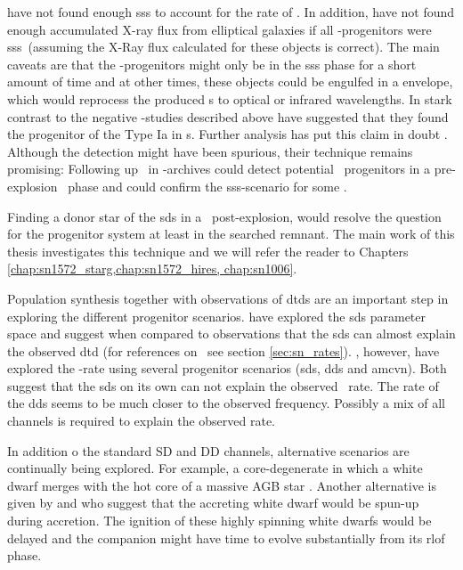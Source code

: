 \cite{2010ApJ...719..474D} have not found enough \gls{sss} to account for the rate of \sneia. In addition, \cite{2010Natur.463..924G} have not found enough accumulated X-ray flux from elliptical galaxies if all \snia-progenitors were \gls{sss}\ (assuming the X-Ray flux calculated for these objects is correct). The main caveats are that the \snia-progenitors might only be in the \gls{sss} phase for a short amount of time and at other times, these objects could be engulfed in a envelope, which would reprocess the produced \xray s to optical or infrared wavelengths. In stark contrast to the negative \xray-studies described above \citet{2008Natur.451..802V} have suggested that they found the progenitor of the Type Ia  in \xray s. Further analysis has put this claim in doubt \citep{2008MNRAS.391..290R}. Although the detection might have been spurious, their technique remains promising: Following up \sneia\ in \xray-archives could detect potential \sneia\ progenitors in a pre-explosion \xray\ phase and could confirm the \gls{sss}-scenario for some \sneia.

Finding a donor star of the \gls{sds} in a \snr\ post-explosion, would resolve the question for the progenitor system at least in the searched remnant. The main work of this thesis investigates this technique and we will refer the reader to Chapters \ref{chap:sn1572_starg,chap:sn1572_hires, chap:sn1006}. 

Population synthesis together with observations of \glspl{dtd} are an important step in exploring the different progenitor scenarios. \citet{2008ApJ...683L.127H, Han:2004p444}  have explored the \gls{sds} parameter space and suggest when compared to observations that the \gls{sds} can almost explain the observed \gls{dtd} (for references on \dtd\ see section \ref{sec:sn_rates}). \citet{2009ApJ...699.2026R, 2010A&A...515A..89M}, however, have explored the \snia-rate using several progenitor scenarios (\gls{sds}, \gls{dds} and \gls{amcvn}). Both suggest that the \gls{sds} on its own can not explain the observed \sneia\ rate. The rate of the \gls{dds} seems to be much closer to the observed frequency. Possibly a mix of all channels is required to explain the observed rate. 


In addition  o the standard SD and DD channels, alternative scenarios are continually being explored. For example, a core-degenerate  in which a white dwarf merges with the hot core of a massive AGB star \citep{2011arXiv1106.2027I}. Another alternative is given by \citet{2011arXiv1102.4342D} and \citet{2011ApJ...730L..34J} who suggest that the accreting white dwarf would be spun-up during accretion. The ignition of these highly spinning white dwarfs would be delayed and the companion might have time to evolve  substantially from its \gls{rlof} phase. 

